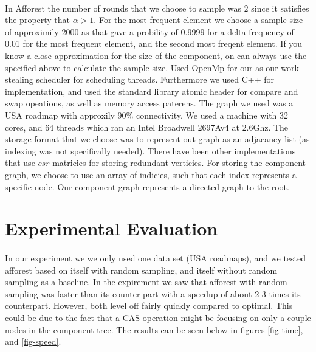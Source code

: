 \documentclass[]{article}
\begin{document}
\paragraph{}
In Afforest the number of rounds that we choose to sample was $2$ since it satisfies the property that $\alpha > 1$.
For the most frequent element we choose a sample size of approximily 2000 as that gave a probility of 0.9999 for a delta frequency of 0.01 for the most frequent element, and the second most freqent element.
If you know a close approximation for the size of the component, on can always use the specified above to calculate the sample size.
Used OpenMp for our as our work stealing scheduler for scheduling threads.
Furthermore we used C++ for implementation, and used the standard library atomic header for compare and swap opeations, as well as memory access paterens.
The graph we used was a USA roadmap with approxily 90\% connectivity.
We used a machine with 32 cores, and 64 threads which ran an Intel Broadwell 2697Av4 at 2.6Ghz.
The storage format that we choose was to represent out graph as an adjacancy list (as indexing was not specifically needed).
There have been other implementations that use $csr$ matricies for storing redundant verticies.
For storing the component graph, we choose to use an array of indicies, such that each index represents a specific node.
Our component graph represents a directed graph to the root.

 \section{Experimental Evaluation}
 \paragraph{}
 In our experiment we we only used one data set (USA roadmaps), and we tested afforest based on itself with random sampling, and itself without random sampling as a baseline. In the expirement we saw that afforest with random sampling was faster than its counter part with a speedup of about 2-3 times its counterpart. However, both level off fairly quickly compared to optimal. This could be due to the fact that a CAS operation might be focusing on only a couple nodes in the component tree. The results can be seen below in figures \ref{fig-time}, and \ref{fig-speed}.
 
\end{document}
